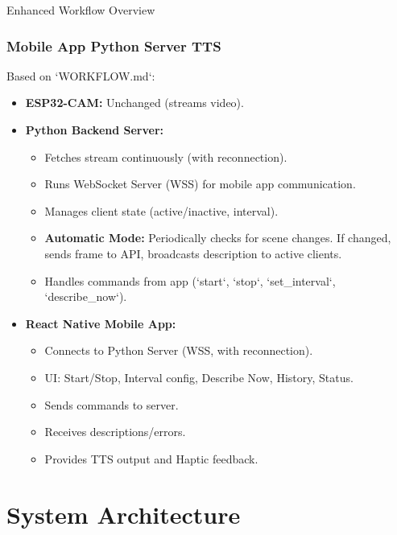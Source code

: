 \documentclass{beamer}
\begin{document}
\begin{frame}{Enhanced Workflow Overview}
  \frametitle{Mobile App \textrightarrow Python Server \textrightarrow TTS}
    Based on `WORKFLOW.md`:
    \begin{itemize}
        \item \textbf{ESP32-CAM:} Unchanged (streams video).
        \item \textbf{Python Backend Server:}
            \begin{itemize}
                \item Fetches stream continuously (with reconnection).
                \item Runs WebSocket Server (WSS) for mobile app communication.
                \item Manages client state (active/inactive, interval).
                \item \textbf{Automatic Mode:} Periodically checks for scene changes. If changed, sends frame to API, broadcasts description to active clients.
                \item Handles commands from app (`start`, `stop`, `set\_interval`, `describe\_now`).
            \end{itemize}
         \item \textbf{React Native Mobile App:}
            \begin{itemize}
                \item Connects to Python Server (WSS, with reconnection).
                \item UI: Start/Stop, Interval config, Describe Now, History, Status.
                \item Sends commands to server.
                \item Receives descriptions/errors.
                \item Provides TTS output and Haptic feedback.
            \end{itemize}
    \end{itemize}
\end{frame}

\section{System Architecture}
\end{document}
